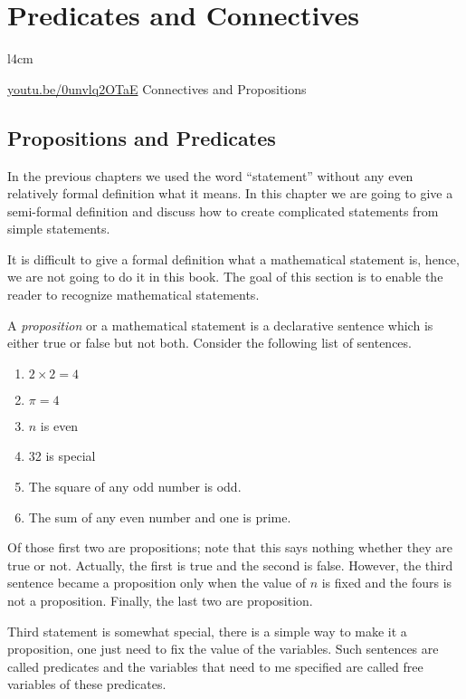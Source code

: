 \chapter{Predicates and Connectives}
\begin{wrapfigure}{l}{4cm}
  \begin{center}
    \vskip -0.5cm
    \vskip 0.25cm
    \href{https://youtu.be/0unvlq2OTaE}{youtu.be/0unvlq2OTaE}
    {\footnotesize Connectives and Propositions}
  \end{center}
  \vskip -0.5cm
\end{wrapfigure}

\section{Propositions and Predicates}
In the previous chapters we used the word ``statement'' without any even
relatively formal definition what it means. In this chapter we are going to
give a semi-formal definition and discuss how to create complicated statements
from simple statements.

It is difficult to give a formal definition what a mathematical statement is,
hence, we are not going to do it in this book. The goal of this section is to
enable the reader to recognize mathematical statements.

A \textit{proposition} or a mathematical statement is a declarative sentence
which is either true or false but not both. Consider the following list of
sentences.
\begin{enumerate}
  \item $2 \times 2 = 4$
  \item $\pi = 4$
  \item $n$ is even
  \item 32 is special
  \item The square of any odd number is odd.
  \item The sum of any even number and one is prime.
\end{enumerate}
Of those first two are propositions; note that this says nothing whether they
are true or not. Actually, the first is true and the second is false.
However, the third sentence became a proposition only when the value
of $n$ is fixed and the fours is not a proposition. Finally, the last
two are proposition.

Third statement is somewhat special, there is a simple way to make it a
proposition, one just need to fix the value of the variables. Such sentences
are called predicates and the variables that need to me specified are called
free variables of these predicates.

